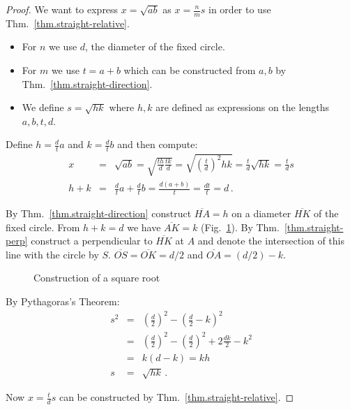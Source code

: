 \begin{proof}
We want to express $x=\sqrt{ab}$ as $x=\displaystyle\frac{n}{m}s$ in order to use Thm.~\ref{thm.straight-relative}.
\begin{itemize}
\setlength{\itemsep}{0pt}
\item For $n$ we use $d$, the diameter of the fixed circle.
\item For $m$ we use $t=a+b$ which can be constructed from $a,b$ by Thm.~\ref{thm.straight-direction}.
\item We define $s=\sqrt{hk}$ where $h,k$ are defined as expressions on the lengths $a,b,t,d$.
\end{itemize}
Define $h=\displaystyle\frac{d}{t}a$ and $k=\displaystyle\frac{d}{t}b$ and then compute:
\begin{eqnarray*}
x&=&\sqrt{ab}=\sqrt{\frac{th}{d}\frac{tk}{d}}=\sqrt{\left(\frac{t}{d}\right)^2hk}=\frac{t}{d}\sqrt{hk}=\frac{t}{d}s\\
h+k &=& \frac{d}{t}a + \frac{d}{t}b = \frac{d(a+b)}{t} = \frac{dt}{t} = d\,.
\end{eqnarray*}

By Thm.~\ref{thm.straight-direction} construct $\overline{HA}= h$ on a diameter $\overline{HK}$ of the fixed circle. From $h+k=d$ we have $\overline{AK}=k$ (Fig.~\ref{f.se-sqrt}). By Thm.~\ref{thm.straight-perp} construct a perpendicular to $\overline{HK}$ at $A$ and denote the intersection of this line with the circle by $S$. $\overline{OS}=\overline{OK}=d/2$ and $\overline{OA}=(d/2)-k$. 
\begin{figure}[t]
\begin{center}
\end{center}
\caption{Construction of a square root}\label{f.se-sqrt}
\end{figure}

By Pythagoras's Theorem:
\begin{eqnarray*}
s^2&=& \left(\frac{d}{2}\right)^2 - \left(\frac{d}{2}-k\right)^2\\
&=& \left(\frac{d}{2}\right)^2 - \left(\frac{d}{2}\right)^2 + 2\frac{dk}{2} - k^2\\
&=& k(d-k) = kh\\
s&=&\sqrt{hk}\,.
\end{eqnarray*}

Now $x=\displaystyle\frac{t}{d}s$ can be constructed by Thm.~\ref{thm.straight-relative}.
\end{proof}
